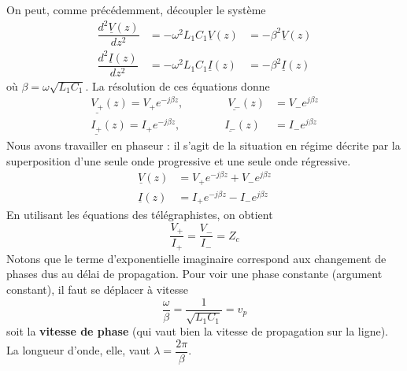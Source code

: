 	On peut, comme précédemment, découpler le système
	\begin{equation}
	\begin{array}{lll}
	\dfrac{d^2\underline{V}(z)}{dz^2} &= -\omega^2 L_1C_1\underline{V}(z) &= -\beta^2
	\underline{V}(z)\\
	\dfrac{d^2\underline{I}(z)}{dz^2} &= -\omega^2 L_1C_1\underline{I}(z) &= -\beta^2
	\underline{I}(z)	
	\end{array}
	\end{equation}
	où $\beta = \omega\sqrt{L_1C_1}$. La résolution de ces équations donne
	\begin{equation}
	\begin{array}{lll}
	\underline{V_+}(z) = V_+e^{-j\beta z},\qquad\qquad 	\underline{V_-}(z) &= V_-e^{j\beta z}\\
	\underline{I_+}(z) = I_+e^{-j\beta z},\qquad\qquad 	\underline{I_-}(z) &= I_-e^{j\beta z}	
	\end{array}
	\end{equation}
	Nous avons travailler en phaseur : il s'agit de la situation en régime décrite par la 
	superposition d'une seule onde progressive et une seule onde régressive.
	\begin{equation}
	\begin{array}{ll}
	\underline{V}(z) &= V_+e^{-j\beta z}+V_-e^{j\beta z}\\
	\underline{I}(z) &= I_+e^{-j\beta z}-I_-e^{j\beta z}	
	\end{array}
	\end{equation}
	En utilisant les équations des télégraphistes, on obtient
	\begin{equation}
	\dfrac{V_+}{I_+} = \dfrac{V_-}{I_-} = Z_c
	\end{equation}
	Notons que le terme d'exponentielle imaginaire correspond aux changement de phases dus 
	au délai de propagation. Pour voir une phase constante (argument constant), il faut se 
	déplacer à vitesse
	\begin{equation}
	\dfrac{\omega}{\beta} = \dfrac{1}{\sqrt{L_1C_1}} = v_p
	\end{equation}
	soit la \textbf{vitesse de phase} (qui vaut bien la vitesse de propagation sur la ligne).
	La longueur d'onde, elle, vaut $\lambda = \dfrac{2\pi}{\beta}$.
	
	\newpage
